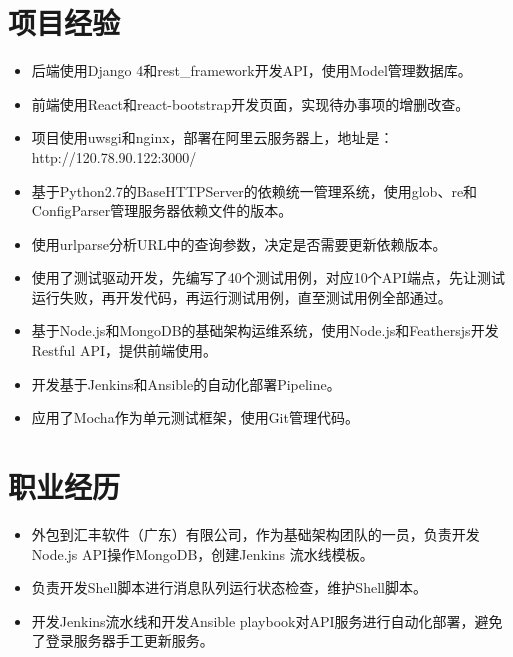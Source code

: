 \documentclass{resume}
\begin{document}
\section{项目经验}
\begin{itemize}[parsep=0.5ex]
  \item 后端使用Django 4和rest\_framework开发API，使用Model管理数据库。
  \item 前端使用React和react-bootstrap开发页面，实现待办事项的增删改查。
  \item 项目使用uwsgi和nginx，部署在阿里云服务器上，地址是：http://120.78.90.122:3000/
\end{itemize}
\begin{itemize}[parsep=0.5ex]
  \item 基于Python2.7的BaseHTTPServer的依赖统一管理系统，使用glob、re和ConfigParser管理服务器依赖文件的版本。
  \item 使用urlparse分析URL中的查询参数，决定是否需要更新依赖版本。
  \item 使用了测试驱动开发，先编写了40个测试用例，对应10个API端点，先让测试运行失败，再开发代码，再运行测试用例，直至测试用例全部通过。
\end{itemize}
\begin{itemize}[parsep=0.5ex]
  \item 基于Node.js和MongoDB的基础架构运维系统，使用Node.js和Feathersjs开发Restful API，提供前端使用。
  \item 开发基于Jenkins和Ansible的自动化部署Pipeline。
  \item 应用了Mocha作为单元测试框架，使用Git管理代码。
\end{itemize}

\section{职业经历}

\begin{itemize}[parsep=0.5ex]
  \item 外包到汇丰软件（广东）有限公司，作为基础架构团队的一员，负责开发Node.js API操作MongoDB，创建Jenkins 流水线模板。
  \item 负责开发Shell脚本进行消息队列运行状态检查，维护Shell脚本。
  \item 开发Jenkins流水线和开发Ansible playbook对API服务进行自动化部署，避免了登录服务器手工更新服务。
\end{itemize}
\end{document}
